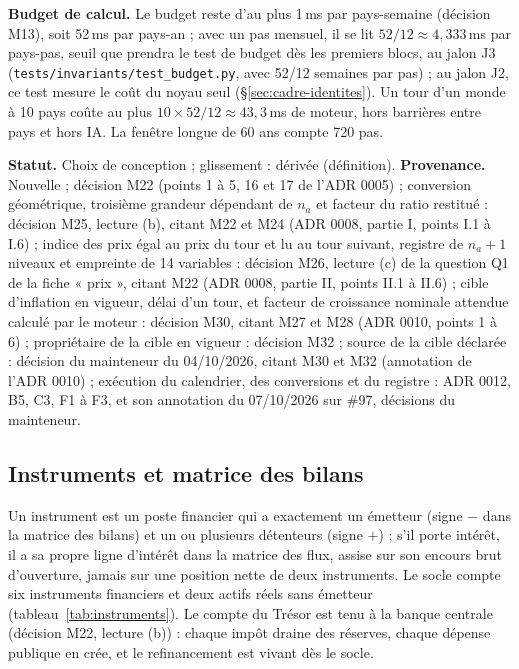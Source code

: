 \documentclass[11pt,a4paper]{article}
\begin{document}
\textbf{Budget de calcul.} Le budget reste d'au plus 1\,ms par pays-semaine (décision M13), soit 52\,ms par pays-an ; avec un pas mensuel, il se lit $52/12 \approx 4{,}333$\,ms par pays-pas, seuil que prendra le test de budget dès les premiers blocs, au jalon J3 (\nolinkurl{tests/invariants/test_budget.py}, avec 52/12 semaines par pas) ; au jalon J2, ce test mesure le coût du noyau seul (\S\ref{sec:cadre-identites}). Un tour d'un monde à 10 pays coûte au plus $10 \times 52/12 \approx 43{,}3$\,ms de moteur, hors barrières entre pays et hors IA. La fenêtre longue de 60 ans compte 720 pas.

\textbf{Statut.} Choix de conception ; glissement : dérivée (définition). \textbf{Provenance.} Nouvelle ; décision M22 (points 1 à 5, 16 et 17 de l'ADR 0005) ; conversion géométrique, troisième grandeur dépendant de $n_a$ et facteur du ratio restitué : décision M25, lecture (b), citant M22 et M24 (ADR 0008, partie I, points I.1 à I.6) ; indice des prix égal au prix du tour et lu au tour suivant, registre de $n_a + 1$ niveaux et empreinte de 14 variables : décision M26, lecture (c) de la question Q1 de la fiche « prix », citant M22 (ADR 0008, partie II, points II.1 à II.6) ; cible d'inflation en vigueur, délai d'un tour, et facteur de croissance nominale attendue calculé par le moteur : décision M30, citant M27 et M28 (ADR 0010, points 1 à 6) ; propriétaire de la cible en vigueur : décision M32 ; source de la cible déclarée : décision du mainteneur du 04/10/2026, citant M30 et M32 (annotation de l'ADR 0010) ; exécution du calendrier, des conversions et du registre : ADR 0012, B5, C3, F1 à F3, et son annotation du 07/10/2026 sur \#97, décisions du mainteneur.

\subsection{Instruments et matrice des bilans}
\label{sec:cadre-bilans}
Un instrument est un poste financier qui a exactement un émetteur (signe $-$ dans la matrice des bilans) et un ou plusieurs détenteurs (signe $+$) ; s'il porte intérêt, il a sa propre ligne d'intérêt dans la matrice des flux, assise sur son encours brut d'ouverture, jamais sur une position nette de deux instruments. Le socle compte six instruments financiers et deux actifs réels sans émetteur (tableau~\ref{tab:instruments}). Le compte du Trésor est tenu à la banque centrale (décision M22, lecture (b)) : chaque impôt draine des réserves, chaque dépense publique en crée, et le refinancement est vivant dès le socle.
\end{document}
